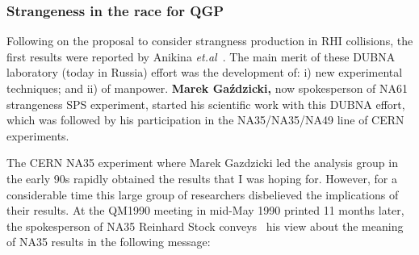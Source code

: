 \begin{mdframed}[linecolor=gray,roundcorner=12pt,backgroundcolor=GreenYellow!15,linewidth=1pt,leftmargin=0cm,rightmargin=0cm,topline=true,bottomline=true,skipabove=12pt]
\end{mdframed}


\subsubsection{Strangeness in the race for QGP}
Following on the proposal to consider strangness production in RHI collisions, the first results were reported by Anikina {\it et.al}~\cite{Anikina:1984zh}. The main merit of these DUBNA laboratory (today in Russia) effort was the development of: i) new experimental techniques; and ii) of manpower. \textbf{Marek Ga\'zdzicki,} now spokesperson of NA61 strangeness SPS experiment, started his scientific work with this DUBNA effort, which was followed by his participation in the NA35/NA35/NA49 line of CERN experiments.

The CERN NA35 experiment where Marek Gazdzicki led the analysis group in the early 90s rapidly obtained the results that I was hoping for. However, for a considerable time this large group of researchers disbelieved the implications of their results. At the QM1990 meeting in mid-May 1990 printed 11 months later, the spokesperson of NA35 Reinhard Stock conveys~\cite{Baechler:1991pp} his view about the meaning of NA35 results in the following message:\\

